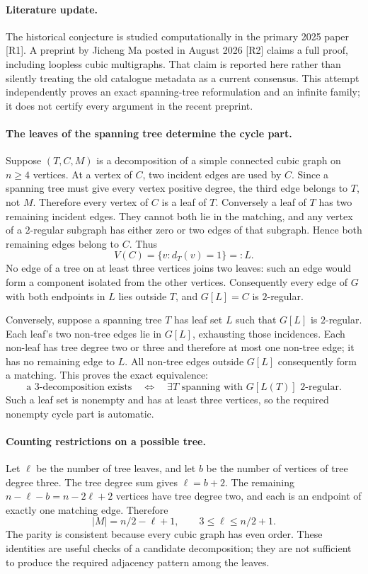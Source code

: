 \documentclass[11pt,a4paper]{article}
\begin{document}
\paragraph{Literature update.}
The historical conjecture is studied computationally in the primary
2025 paper [R1]. A preprint by Jicheng Ma posted in August 2026 [R2]
claims a full proof, including loopless cubic multigraphs. That claim
is reported here rather than silently treating the old catalogue
metadata as a current consensus. This attempt independently proves
an exact spanning-tree reformulation and an infinite family; it
does not certify every argument in the recent preprint.

\paragraph{The leaves of the spanning tree determine the cycle part.}
Suppose $(T,C,M)$ is a decomposition of a simple connected cubic
graph on $n\ge4$ vertices. At a vertex of $C$, two incident edges
are used by $C$. Since a spanning tree must give every vertex
positive degree, the third edge belongs to $T$, not $M$. Therefore
every vertex of $C$ is a leaf of $T$. Conversely a leaf of $T$
has two remaining incident edges. They cannot both lie in the
matching, and any vertex of a $2$-regular subgraph has either zero
or two edges of that subgraph. Hence both remaining edges belong
to $C$. Thus
\[
 V(C)=\{v:d_T(v)=1\}=:L.
\]
No edge of a tree on at least three vertices joins two leaves:
such an edge would form a component isolated from the other vertices.
Consequently every edge of $G$ with both endpoints in $L$ lies
outside $T$, and $G[L]=C$ is $2$-regular.

Conversely, suppose a spanning tree $T$ has leaf set $L$ such that
$G[L]$ is $2$-regular. Each leaf's two non-tree edges lie in
$G[L]$, exhausting those incidences. Each non-leaf has tree degree
two or three and therefore at most one non-tree edge; it has no
remaining edge to $L$. All non-tree edges outside $G[L]$ consequently
form a matching. This proves the exact equivalence:
\[
 \text{a 3-decomposition exists}\quad\Longleftrightarrow\quad
 \exists T\text{ spanning with }G[L(T)]\text{ 2-regular}.
\]
Such a leaf set is nonempty and has at least three vertices, so
the required nonempty cycle part is automatic.

\paragraph{Counting restrictions on a possible tree.}
Let $\ell$ be the number of tree leaves, and let $b$ be the number
of vertices of tree degree three. The tree degree sum gives
$\ell=b+2$. The remaining $n-\ell-b=n-2\ell+2$ vertices have tree
degree two, and each is an endpoint of exactly one matching edge.
Therefore
\[
 |M|=n/2-\ell+1,\qquad 3\le\ell\le n/2+1.
\]
The parity is consistent because every cubic graph has even order.
These identities are useful checks of a candidate decomposition;
they are not sufficient to produce the required adjacency pattern
among the leaves.
\end{document}
